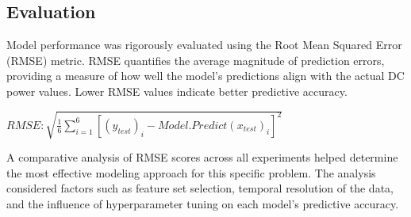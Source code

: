 \subsection{Evaluation}

Model performance was rigorously evaluated using the Root Mean Squared Error (RMSE) metric. RMSE quantifies the average magnitude of prediction errors, providing a measure of how well the model's predictions align with the actual DC power values. Lower RMSE values indicate better predictive accuracy.

$RMSE: \sqrt{\frac{1}{6}\sum_{i=1}^{6} \left[ (y_{test})_i - Model.Predict(x_{test})_i \right]^2}$

A comparative analysis of RMSE scores across all experiments helped determine the most effective modeling approach for this specific problem. The analysis considered factors such as feature set selection, temporal resolution of the data, and the influence of hyperparameter tuning on each model's predictive accuracy.